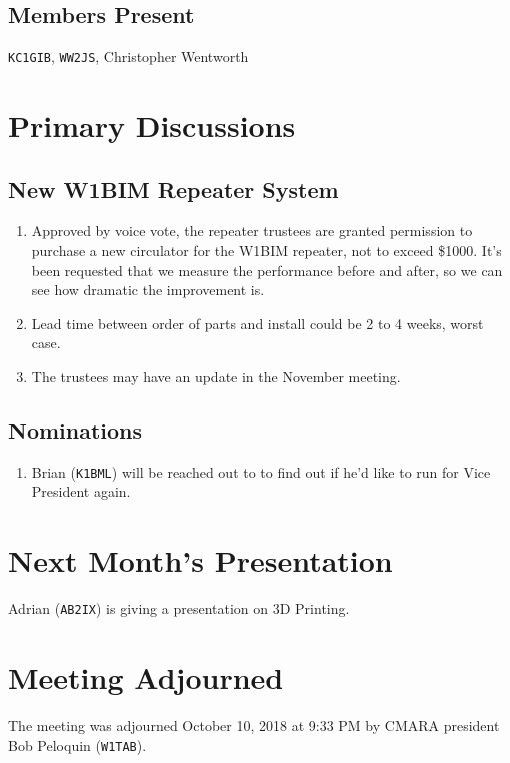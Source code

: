 \documentclass[10pt,letterpaper]{article}
\begin{document}
\subsection{Members Present}
\texttt{KC1GIB},
\texttt{WW2JS},
Christopher Wentworth


\section{Primary Discussions}

\subsection{New W1BIM Repeater System}
\begin{enumerate}
\item Approved by voice vote, the repeater trustees are granted permission to purchase a new circulator for the W1BIM repeater, not to exceed \$1000. It's been requested that we measure the performance before and after, so we can see how dramatic the improvement is.
\item Lead time between order of parts and install could be 2 to 4 weeks, worst case.
\item The trustees may have an update in the November meeting.
\end{enumerate}

\subsection{Nominations}
\begin{enumerate}
  \item Brian (\texttt{K1BML}) will be reached out to to find out if he'd like to run for Vice President again.
\end{enumerate}


\section{Next Month's Presentation}
Adrian (\texttt{AB2IX}) is giving a presentation on 3D Printing.

\section{Meeting Adjourned}
The meeting was adjourned October 10, 2018 at 9:33 PM by CMARA president Bob Peloquin (\texttt{W1TAB}).
\end{document}
